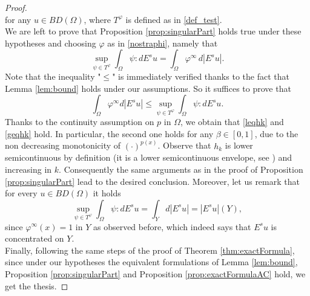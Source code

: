 \documentclass[a4paper,11pt,oneside,notitlepage]{article}
\newtheorem{remark}[theorem]{Remark}
\numberwithin{equation}{section}
\def\R{\mathbb{R}}
\newcommand{\vphi}{\varphi}
\begin{document}
\begin{proof}
\begin{equation*}
    \end{equation*}
    for any $u \in BD(\Omega)$, where $T^\vphi$ is defined as in \eqref{def_test}.
    \\
    We are left to prove that Proposition \ref{prop:singularPart} holds true under these hypotheses and choosing $\vphi$ as in \eqref{nostraphi}, namely that
    \begin{equation*}
        \sup_{\psi \in T^\vphi} \int_\Omega \psi : dE^su = \int_\Omega \vphi^\infty \, d|E^su|.
    \end{equation*}
    Note that the inequality "$\le$" is immediately verified thanks to the fact that Lemma \ref{lem:bound} holds under our assumptions. So it suffices to prove that
    \begin{equation*}
        \int_\Omega \varphi^\infty d |E^s u|\leq \sup_{\psi \in T^\varphi}\int_\Omega \psi : d E^s u.
    \end{equation*}
    Thanks to the continuity assumption on $p$ in $\Omega$, \color{black} we obtain that \eqref{leqhk} and \eqref{geqhk} hold. In particular, the second one holds for any $\beta \in [0,1]$, due to the non decreasing monotonicity of $(\cdot)^{p(x)}$. Observe that $h_k$ is lower semicontinuous by definition (it is  a lower semicontinuous envelope, see \cite[Chapter 1]{DM}) and increasing in $k$. Consequently the same arguments as in the proof of Proposition \ref{prop:singularPart} lead to the desired conclusion. Moreover, let us remark that for every $u \in BD(\Omega)$ it holds
    \begin{equation*}
        \sup_{\psi \in T^\vphi} \int_\Omega \psi : d E^s u = \int_Y d|E^s u| = |E^s u|(Y),
    \end{equation*}
    since $\vphi^\infty(x) = 1$ in $Y$ as observed before, which indeed says that $E^s u$ is concentrated on $Y$.
    \\
    Finally, following the same steps of the proof of Theorem \ref{thm:exactFormula}, since under our hypotheses the equivalent formulations of Lemma \ref{lem:bound}, Proposition \ref{prop:singularPart} and Proposition \ref{prop:exactFormulaAC} hold, we get the thesis.
\end{proof}


    
\end{document}
